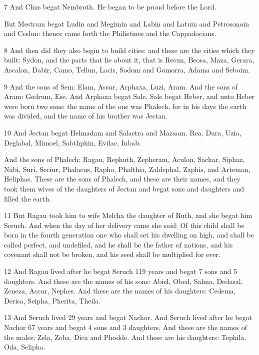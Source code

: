 \par 7 And Chus begat Nembroth. He began to be proud before the Lord.

\par But Mestram begat Ludin and Megimin and Labin and Latuin and Petrosonoin and Ceslun: thence came forth the Philistines and the Cappadocians.

\par 8 And then did they also begin to build cities: and these are the cities which they built: Sydon, and the parts that lie about it, that is Resun, Beosa, Maza, Gerara, Ascalon, Dabir, Camo, Tellun, Lacis, Sodom and Gomorra, Adama and Seboim.

\par 9 And the sons of Sem: Elam, Assur, Arphaxa, Luzi, Aram. And the sons of Aram: Gedrum, Ese. And Arphaxa begat Sale, Sale begat Heber, and unto Heber were born two sons: the name of the one was Phalech, for in his days the earth was divided, and the name of his brother was Jectan.

\par 10 And Jectan begat Helmadam and Salastra and Mazaam, Rea, Dura, Uzia, Deglabal, Mimoel, Sabthphin, Evilac, Iubab.

\par And the sons of Phalech: Ragau, Rephuth, Zepheram, Aculon, Sachar, Siphaz, Nabi, Suri, Seciur, Phalacus, Rapho, Phalthia, Zaldephal, Zaphis, and Arteman, Heliphas. These are the sons of Phalech, and these are their names, and they took them wives of the daughters of Jectan and begat sons and daughters and filled the earth.

\par 11 But Ragau took him to wife Melcha the daughter of Ruth, and she begat him Seruch. And when the day of her delivery came she said: Of this child shall be born in the fourth generation one who shall set his dwelling on high, and shall be called perfect, and undefiled, and he shall be the father of nations, and his covenant shall not be broken, and his seed shall be multiplied for ever.

\par 12 And Ragau lived after he begat Seruch 119 years and begat 7 sons and 5 daughters. And these are the names of his sons: Abiel, Obed, Salma, Dedasal, Zeneza, Accur, Nephes. And these are the names of his daughters: Cedema, Derisa, Seipha, Pherita, Theila.

\par 13 And Seruch lived 29 years and begat Nachor. And Seruch lived after he begat Nachor 67 years and begat 4 sons and 3 daughters. And these are the names of the males: Zela, Zoba, Dica and Phodde. And these are his daughters: Tephila, Oda, Selipha.

